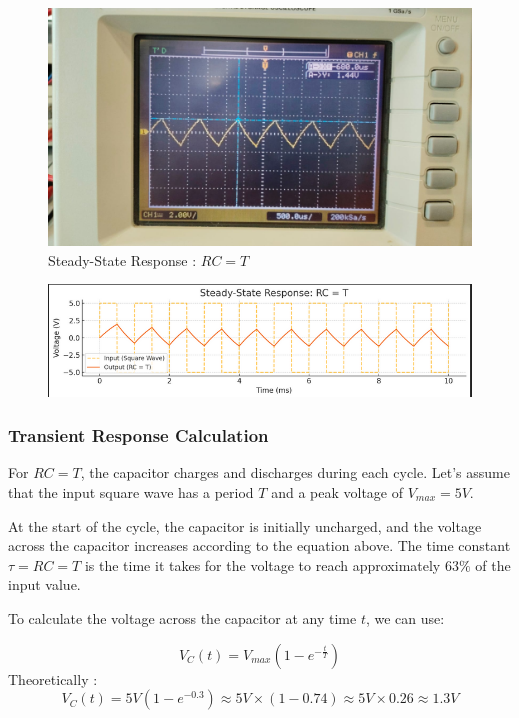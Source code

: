 \documentclass[a4paper,12pt]{article}
\begin{document}
\begin{figure}[H]
    \centering
    \includegraphics[width=\textwidth]{figs/rc=t.jpeg}
    \caption{Steady-State Response : \( RC = T \)}
\end{figure}
\begin{figure}[H]
    \centering
    \includegraphics[width=\textwidth]{figs/rc=t_prog.png}
\end{figure}

\subsubsection*{Transient Response Calculation}
For \( RC = T \), the capacitor charges and discharges during each cycle. Let's assume that the input square wave has a period \( T \) and a peak voltage of \( V_{max} = 5V \).

At the start of the cycle, the capacitor is initially uncharged, and the voltage across the capacitor increases according to the equation above. The time constant \( \tau = RC = T \) is the time it takes for the voltage to reach approximately \( 63\% \) of the input value.

To calculate the voltage across the capacitor at any time \( t \), we can use:

\[
V_C(t) = V_{max} \left(1 - e^{-\frac{t}{T}}\right)
\]
Theoretically :
\[
V_C\left(t\right) = 5V \left( 1 - e^{-0.3} \right) \approx 5V \times (1 - 0.74) \approx 5V \times 0.26 \approx 1.3V
\]
\end{document}
